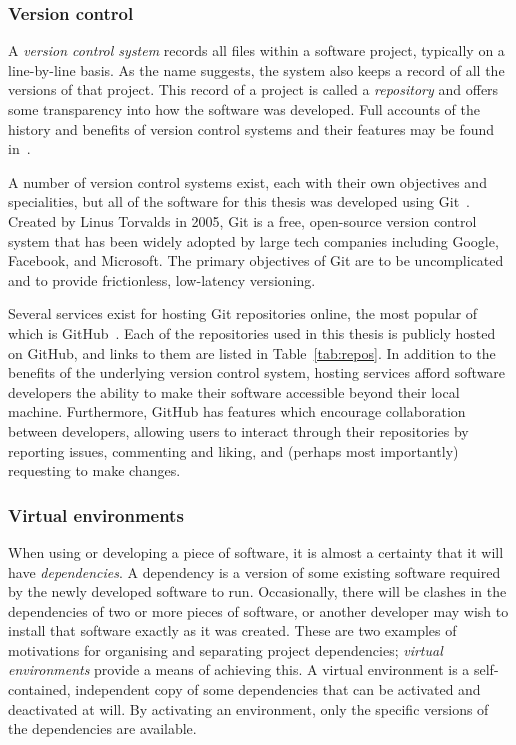 \subsubsection{Version control}

A \emph{version control system} records all files within a software project,
typically on a line-by-line basis. As the name suggests, the system also keeps a
record of all the versions of that project. This record of a project is called a
\emph{repository} and offers some transparency into how the software was
developed. Full accounts of the history and benefits of version control systems
and their features may be found in~\cite{Ruparelia2010,Zolkifli2018}.

A number of version control systems exist, each with their own objectives and
specialities, but all of the software for this thesis was developed using
Git~\cite{git}. Created by Linus Torvalds in 2005, Git is a free, open-source
version control system that has been widely adopted by large tech companies
including Google, Facebook, and Microsoft. The primary objectives of Git are to
be uncomplicated and to provide frictionless, low-latency versioning.

Several services exist for hosting Git repositories online, the most popular of
which is GitHub~\cite{github}. Each of the repositories used in this thesis is
publicly hosted on GitHub, and links to them are listed in
Table~\ref{tab:repos}. In addition to the benefits of the underlying version
control system, hosting services afford software developers the ability to make
their software accessible beyond their local machine. Furthermore, GitHub has
features which encourage collaboration between developers, allowing users to
interact through their repositories by reporting issues, commenting and
liking, and (perhaps most importantly) requesting to make changes.

\subsubsection{Virtual environments}

When using or developing a piece of software, it is almost a certainty that it
will have \emph{dependencies}. A dependency is a version of some existing
software required by the newly developed software to run. Occasionally, there
will be clashes in the dependencies of two or more pieces of software, or
another developer may wish to install that software exactly as it was created.
These are two examples of motivations for organising and separating project
dependencies; \emph{virtual environments} provide a means of achieving this. A
virtual environment is a self-contained, independent copy of some dependencies
that can be activated and deactivated at will. By activating an environment,
only the specific versions of the dependencies are available.


